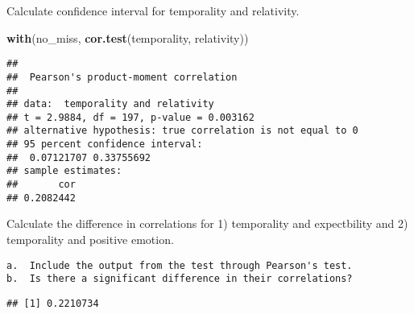 \documentclass[
]{article}
\newenvironment{Shaded}{\begin{snugshade}}{\end{snugshade}}
\newcommand{\CommentTok}[1]{\textcolor[rgb]{0.56,0.35,0.01}{\textit{#1}}}
\newcommand{\DataTypeTok}[1]{\textcolor[rgb]{0.13,0.29,0.53}{#1}}
\newcommand{\KeywordTok}[1]{\textcolor[rgb]{0.13,0.29,0.53}{\textbf{#1}}}
\newcommand{\NormalTok}[1]{#1}
\newcommand{\OperatorTok}[1]{\textcolor[rgb]{0.81,0.36,0.00}{\textbf{#1}}}
\newcommand{\StringTok}[1]{\textcolor[rgb]{0.31,0.60,0.02}{#1}}
\begin{document}
Calculate confidence interval for temporality and relativity.

\begin{Shaded}
\begin{Highlighting}[]
\KeywordTok{with}\NormalTok{(no_miss, }\KeywordTok{cor.test}\NormalTok{(temporality, relativity))}
\end{Highlighting}
\end{Shaded}

\begin{verbatim}
## 
##  Pearson's product-moment correlation
## 
## data:  temporality and relativity
## t = 2.9884, df = 197, p-value = 0.003162
## alternative hypothesis: true correlation is not equal to 0
## 95 percent confidence interval:
##  0.07121707 0.33755692
## sample estimates:
##       cor 
## 0.2082442
\end{verbatim}

Calculate the difference in correlations for 1) temporality and
expectbility and 2) temporality and positive emotion.

\begin{verbatim}
a.  Include the output from the test through Pearson's test.
b.  Is there a significant difference in their correlations?
\end{verbatim}

\begin{Shaded}
\end{Shaded}

\begin{verbatim}
## [1] 0.2210734
\end{verbatim}

\begin{Shaded}
\end{Shaded}
\end{document}
